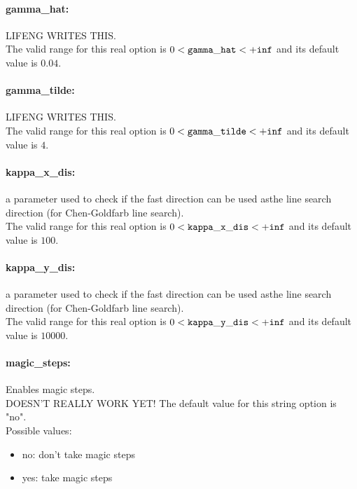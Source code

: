 \paragraph{gamma\_hat:}\label{sec:gamma_hat} LIFENG WRITES THIS. $\;$ \\
 The valid range for this real option is 
$0 <  {\tt gamma\_hat } <  {\tt +inf}$
and its default value is $0.04$.


\paragraph{gamma\_tilde:}\label{sec:gamma_tilde} LIFENG WRITES THIS. $\;$ \\
 The valid range for this real option is 
$0 <  {\tt gamma\_tilde } <  {\tt +inf}$
and its default value is $4$.


\paragraph{kappa\_x\_dis:}\label{sec:kappa_x_dis} a parameter used to check if the fast direction can be used asthe line search direction (for Chen-Goldfarb line search). $\;$ \\
 The valid range for this real option is 
$0 <  {\tt kappa\_x\_dis } <  {\tt +inf}$
and its default value is $100$.


\paragraph{kappa\_y\_dis:}\label{sec:kappa_y_dis} a parameter used to check if the fast direction can be used asthe line search direction (for Chen-Goldfarb line search). $\;$ \\
 The valid range for this real option is 
$0 <  {\tt kappa\_y\_dis } <  {\tt +inf}$
and its default value is $10000$.


\paragraph{magic\_steps:}\label{sec:magic_steps} Enables magic steps. $\;$ \\
 DOESN'T REALLY WORK YET!
The default value for this string option is "no".
\\ 
Possible values:
\begin{itemize}
   \item no: don't take magic steps
   \item yes: take magic steps
\end{itemize}

